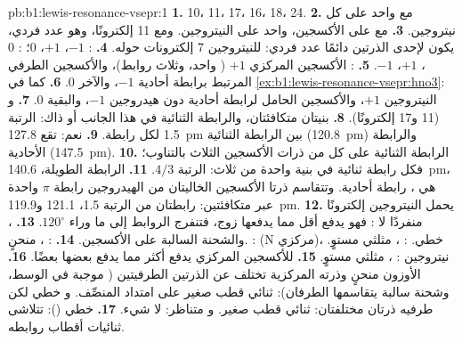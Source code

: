 \begin{solution}{pb:b1:lewis-resonance-vsepr:1}
\textbf{1.}  10،  11،  17،  16،  18،
 24.
\textbf{2.}  مع  واحد على كل نيتروجين.
\textbf{3.}  مع  على الأكسجين،  واحد
 على النيتروجين. ومع 11 إلكترونًا، وهو عدد فردي، يكون لإحدى الذرتين
دائمًا عدد فردي: للنيتروجين 7 إلكترونات حوله.
\textbf{4.} : $-1$، $+1$، $0$؛ : $0$، $+1$، $-1$.
\textbf{5.} : الأكسجين المركزي $+1$ ( واحد، وثلاث روابط)،
والأكسجين الطرفي المرتبط برابطة أحادية $-1$، والآخر 0.
\textbf{6.} كما في \cref{ex:b1:lewis-resonance-vsepr:hno3}: النيتروجين $+1$،
والأكسجين الحامل لرابطة أحادية دون هيدروجين $-1$، والبقية 0.
\textbf{7.}  و (11 و17 إلكترونًا).
\textbf{8.} بنيتان متكافئتان، والرابطة الثنائية في هذا الجانب أو ذاك:
الرتبة 1.5 لكل رابطة.
\textbf{9.} نعم: تقع \qty{127.8}{pm} بين الرابطة الثنائية
(\qty{120.8}{pm}) والرابطة الأحادية (\qty{147.5}{pm}).
\textbf{10.} الرابطة الثنائية على كل من ذرات الأكسجين الثلاث بالتناوب؛ فكل
رابطة  ثنائية في بنية واحدة من ثلاث: الرتبة $4/3$.
\textbf{11.} الرابطة الطويلة، \qty{140.6}{pm}، هي ، رابطة أحادية.
وتتقاسم ذرتا الأكسجين الخاليتان من الهيدروجين رابطة $\pi$ واحدة عبر  متكافئتين: رابطتان من الرتبة 1.5، 121.1
و\qty{119.9}{pm}.
\textbf{12.} يحمل النيتروجين إلكترونًا منفردًا لا :
فهو يدفع  أقل مما يدفعها زوج، فتنفرج الروابط
إلى ما وراء $120^\circ$.
\textbf{13.} ، والشحنة السالبة على الأكسجين.
\textbf{14.} : ، منحنٍ. :  (N مركزي)،
خطي. : ، مثلثي مستوٍ. نيتروجين :
، مثلثي مستوٍ.
\textbf{15.}  للأكسجين المركزي يدفع 
أكثر مما يدفع بعضها بعضًا.
\textbf{16.} الأوزون منحنٍ وذرته المركزية تختلف عن الذرتين
الطرفيتين ( موجبة في الوسط، وشحنة سالبة يتقاسمها
الطرفان): ثنائي قطب صغير على امتداد المنصِّف. و خطي لكن
طرفيه ذرتان مختلفتان: ثنائي قطب صغير. و متناظر: لا شيء.
\textbf{17.}  خطي (): تتلاشى ثنائيات أقطاب روابطه.

\end{solution}
